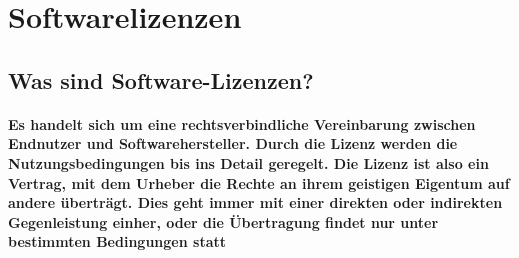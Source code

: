 \documentclass[a4paper]{article}
\begin{document}
    \section{Softwarelizenzen}\label{sec:softwarelizenzen}

    \subsection{\color{red}Was sind Software-Lizenzen?}\label{subsec:was-sind-software-lizenzen?}

    \paragraph{Es handelt sich um eine rechtsverbindliche Vereinbarung zwischen Endnutzer und Softwarehersteller. Durch die Lizenz werden die Nutzungsbedingungen bis ins Detail geregelt. Die Lizenz ist also ein Vertrag, mit dem Urheber die Rechte an ihrem geistigen Eigentum auf andere überträgt. Dies geht immer mit einer direkten oder indirekten Gegenleistung einher, oder die Übertragung findet nur unter bestimmten Bedingungen statt}
\end{document}
